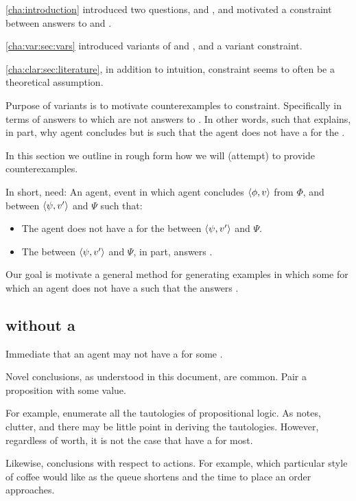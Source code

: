 \begin{note}
  \autoref{cha:introduction} introduced two questions, \qWhy{} and \qHow{}, and motivated a constraint between answers to \qWhy{} and \qHow{}.

  \autoref{cha:var:sec:vars} introduced variants of \qWhy{} and \qHow{}, and a variant constraint.

  \autoref{cha:clar:sec:literature}, in addition to intuition, constraint seems to often be a theoretical assumption.

  Purpose of variants is to motivate counterexamples to constraint.
  Specifically in terms of answers to \qWhyVnP{} which are not answers to \qHowV{}.
  In other words, \ros{} such that \ros{} explains, in part, why agent concludes but is such that the agent does not have a \wit{} for the \ros{}.

  In this section we outline in rough form how we will (attempt) to provide counterexamples.

  In short, need:
  An agent, event in which agent concludes \(\langle \phi, v \rangle\) from \(\Phi\), and \ros{} between \(\langle \psi, v' \rangle\) and \(\Psi\) such that:

  \begin{itemize}
  \item
    The agent does not have a \wit{} for the \ros{} between \(\langle \psi, v' \rangle\) and \(\Psi\).
  \item
    The \ros{} between \(\langle \psi, v' \rangle\) and \(\Psi\), in part, answers \qWhyVnP{}.
  \end{itemize}

  Our goal is motivate a general method for generating examples in which some \ros{} for which an agent does not have a \wit{} such that the \ros{} answers \qWhyVnP{}.
\end{note}

\subsection{ without a \wit{}}

\begin{note}
  Immediate that an agent may not have a \wit{} for some \ros{}.

  Novel conclusions, as understood in this document, are common.
  Pair a proposition with some value.

  For example, enumerate all the tautologies of propositional logic.
  As \citeauthor{Harman:1973ww} notes, clutter, and there may be little point in deriving the tautologies.
  However, regardless of worth, it is not the case that have a \wit{} for most.

  Likewise, conclusions with respect to actions.
  For example, which particular style of coffee would like as the queue shortens and the time to place an order approaches.
\end{note}

